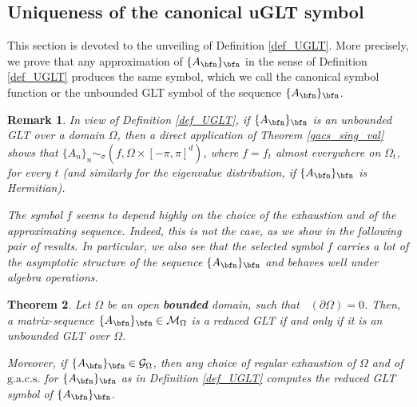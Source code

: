 \documentclass{amsart}
\newtheorem{thm}{Theorem}[section]
\newtheorem{rem}[thm]{Remark}
\DeclareMathOperator{\Ld}{\mathcal{L}^d}
\begin{document}
\subsection{Uniqueness of the canonical uGLT symbol} This section is devoted to the unveiling of Definition \ref{def_UGLT}. More precisely, we prove that any approximation of $\{A_\bfn\}_\bfn$ in the sense of Definition \ref{def_UGLT} produces the same symbol, which we call the canonical symbol function or the unbounded GLT symbol of the sequence $\{A_\bfn\}_\bfn$.

\begin{rem}\label{rem_unboundedGLT_distribution}
    In view of Definition \ref{def_UGLT}, if $\{A_\bfn\}_\bfn$ is an unbounded GLT over a domain $\Omega$, then a direct application of Theorem \ref{gacs_sing_val} shows that $\{A_n\}_n \sim_{\sigma} (f,\Omega\times[-\pi,\pi]^d)$, where $f=f_t$ almost everywhere on $\Omega_t$, for every $t$ (and similarly for the eigenvalue distribution, if $\{A_\bfn\}_\bfn$ is Hermitian).

    The symbol $f$ seems to depend highly on the choice of the exhaustion and of the approximating sequence. Indeed, this is not the case, as we show in the following pair of results. In particular, we also see that the selected symbol $f$ carries a lot of the asymptotic structure of the sequence $\{A_\bfn\}_\bfn$ and behaves well under algebra operations.
\end{rem}
\begin{thm}\label{RGLT_equiv_UGLT_bounded}
    Let $\Omega$ be an open \textbf{bounded} domain, such that $\Ld(\partial\Omega)=0$. Then, a matrix-sequence $\{A_\bfn\}_\bfn\in\mathcal{M}_\Omega$ is a reduced GLT if and only if it is an unbounded GLT over $\Omega$.

    Moreover, if $\{A_\bfn\}_\bfn\in\mathcal{G}_\Omega$, then any choice of regular exhaustion of $\Omega$ and of $\mathrm{g.a.c.s.}$ for $\{A_\bfn\}_\bfn$ as in Definition \ref{def_UGLT} computes the reduced GLT symbol of $\{A_\bfn\}_\bfn$.

\end{thm}
\end{document}
